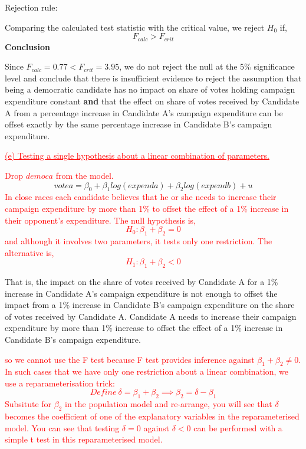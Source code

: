 \documentclass[12pt]{report}
\begin{document}
\noindent Rejection rule: 

\noindent Comparing the calculated test statistic with the critical value, we reject $H_0$ if,
$$F_{calc} > F_{crit}$$
\noindent \textbf{Conclusion}

\noindent Since $F_{calc}=0.77 < F_{crit}=3.95$, we do not reject the null at the 5\% significance level and conclude that there is insufficient evidence to reject the assumption that being a democratic candidate has no impact on share of votes holding campaign expenditure constant \textbf{and} that the effect on share of votes received by Candidate A from a percentage increase in Candidate A’s campaign expenditure can be offset exactly by the same percentage increase in Candidate B’s campaign expenditure.

\newpage
\noindent \textcolor{red}
{
	\uline{(e) Testing a single hypothesis about a linear combination of parameters.}
}

\noindent \textcolor{red}
{
	Drop $democa$ from the model.
}
$$votea = \beta_0 + \beta_1log(expenda) + \beta_2log(expendb) + u $$
\noindent \textcolor{red}
{
	In close races each candidate believes that he or she needs to increase their campaign expenditure by more than 1\% to offset the effect of a 1\% increase in their opponent’s expenditure. The null hypothesis is,
	$$H_0: \beta_1 + \beta_2 = 0$$ 
	and although it involves two parameters, it tests only one restriction. The alternative is, 
	$$H_1: \beta_1 + \beta_2 < 0$$ 
}

\noindent That is, the impact on the share of votes received by Candidate A for a 1\% increase in Candidate A’s campaign expenditure is not enough to offset the impact from a 1\% increase in Candidate B’s campaign expenditure on the share of votes received by Candidate A. Candidate A needs to increase their campaign expenditure by more than 1\% increase to  offset the effect of a 1\% increase in Candidate B's campaign expenditure.

\noindent \textcolor{red}
{
	so we cannot use the F test because F test provides inference against $\beta_1 + \beta_2 \neq 0$. In such cases that we have only one restriction about a linear combination, we use a reparameterisation trick: 
	$$Define\ \delta = \beta_1 + \beta_2 \implies \beta_2 = \delta - \beta_1$$
	Subsitute for $\beta_2$ in the population model and re-arrange, you will see that $\delta$ becomes the coefficient of one of the explanatory variables in the reparameterised model.
	You can see that testing $\delta = 0$ against $\delta < 0$ can be performed with a simple t test in this reparameterised model.
}
\end{document}
